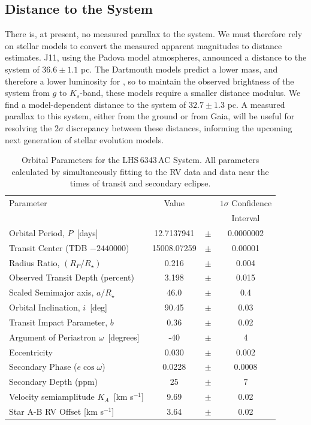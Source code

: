 \subsection{Distance to the \LHS{} System}

There is, at present, no measured parallax to the \LC{} system. 
We must therefore rely on stellar models to convert the measured apparent magnitudes to distance estimates.
J11, using the Padova model atmospheres, announced a distance to the system of $36.6 \pm 1.1$ pc. 
The Dartmouth models predict a lower mass, and therefore a lower luminosity for \LA{}, so to maintain the observed brightness of the system from $g$ to $K_s$-band, these models require a smaller distance modulus.
We find a model-dependent distance to the system of $32.7 \pm 1.3$ pc.
A measured parallax to this system, either from the ground or from Gaia, will be useful for resolving the $2\sigma$ discrepancy between these distances, informing the upcoming next generation of stellar evolution models.

\begin{table}[hbt!]
\centering
\begin{tabular}{lccc}
\hline
\footnotesize
Parameter & 
Value    &
 &
$1\sigma$ Confidence \\
 & & & Interval \\
\hline
Orbital Period, $P$~[days] & 12.7137941 & $\pm$& 0.0000002 \\
Transit Center (TDB $- 2440000$) & 15008.07259 & $\pm$ &  0.00001 \\
Radius Ratio, $(R_P/R_\star)$ &      0.216 & $\pm$ &       0.004 \\
Observed Transit Depth (percent) &  3.198 & $\pm$ &       0.015 \\
Scaled Semimajor axis, $a/R_\star$  &  46.0 & $\pm$ &       0.4 \\
Orbital Inclination, $i$~[deg] &  90.45 & $\pm$ &     0.03  \\
Transit Impact Parameter, $b$ &  0.36 & $\pm$ &     0.02 \\
Argument of Periastron $\omega$~[degrees] & -40 & $\pm$ &      4 \\
Eccentricity  &  0.030 & $\pm$ &      0.002  \\
Secondary Phase ($e \cos \omega$) & 0.0228 & $\pm$ &      0.0008 \\
Secondary Depth (ppm) & 25 & $\pm$ & 7 \\
Velocity semiamplitude $K_A$~[km s$^{-1}$] &  9.69 & $\pm$ &       0.02 \\
Star A-B RV Offset [km s$^{-1}$] & 3.64 & $\pm$ &       0.02  \\
\hline
\end{tabular}
\caption[Orbital Parameters for the LHS\,6343\,AC System]{Orbital Parameters for the LHS\,6343\,AC System. All parameters calculated by simultaneously fitting to the RV data and \itk{} data near the times of transit and secondary eclipse.}
\label{OrbitTable}
\end{table}

